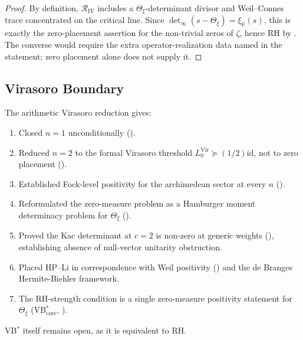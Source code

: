 \begin{proof}
By definition, \(\mathcal{R}_{\mathrm{IV}}\) includes a
\(\Theta_{\xi}\)-determinant divisor and Weil--Connes trace
concentrated on the critical line. Since
\(\det_{\infty}(s-\Theta_{\xi})=\xi_{\mathbb R}(s)\), this is exactly
the zero-placement assertion for the non-trivial zeros of \(\zeta\),
hence RH by . The converse
would require the extra operator-realization data named in the
statement; zero placement alone does not supply it.
\end{proof}

\subsection{Virasoro Boundary}
\label{v4-arith:vb:framework-change}

\begin{remark}
\label{v4-arith:vb:rem:structural-change}
The arithmetic Virasoro reduction gives:
\begin{enumerate}
\item Closed \(n=1\) unconditionally
().
\item Reduced \(n=2\) to the formal Virasoro threshold
\(L_{0}^{\mathrm{Vir}}\succeq(1/2)\mathrm{id}\), not to zero placement
().
\item Established Fock-level positivity for the archimedean sector
at every \(n\) ().
\item Reformulated the zero-measure problem as a Hamburger moment
determinacy problem for \(\Theta_{\xi}\)
().
\item Proved the Kac determinant at \(c=2\) is non-zero at generic
weights (), establishing
absence of null-vector unitarity obstruction.
\item Placed HP--Li in correspondence with Weil positivity
() and the de Branges
Hermite-Biehler framework.
\item The RH-strength condition is a single zero-measure positivity
statement for \(\Theta_{\xi}\)
(VB\(^{*}_{\mathrm{core}}\),
).
\end{enumerate}
VB\(^{*}\) itself remains open, as it is equivalent to RH.
\end{remark}

